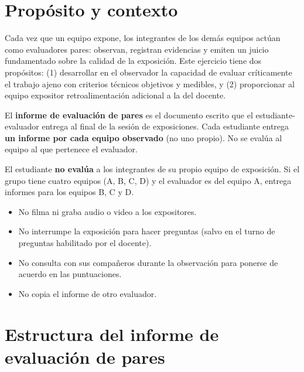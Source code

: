 \documentclass[11pt]{article}
\begin{document}
\section{\textcolor{utegreendk}{Propósito y contexto}}

Cada vez que un equipo expone, los integrantes de los demás equipos actúan como evaluadores pares: observan, registran evidencias y emiten un juicio fundamentado sobre la calidad de la exposición. Este ejercicio tiene dos propósitos: (1) desarrollar en el observador la capacidad de evaluar críticamente el trabajo ajeno con criterios técnicos objetivos y medibles, y (2) proporcionar al equipo expositor retroalimentación adicional a la del docente.

El \textbf{informe de evaluación de pares} es el documento escrito que el estudiante-evaluador entrega al final de la sesión de exposiciones. Cada estudiante entrega \textbf{un informe por cada equipo observado} (no uno propio). No se evalúa al equipo al que pertenece el evaluador.

\begin{cajaclave}[title=Regla de exclusión]
	El estudiante \textbf{no evalúa} a los integrantes de su propio equipo de exposición. Si el grupo tiene cuatro equipos (A, B, C, D) y el evaluador es del equipo A, entrega informes para los equipos B, C y D.
\end{cajaclave}

\begin{cajaclave}[title=Qué NO debe hacer el evaluador]
	\begin{itemize}[leftmargin=14pt,itemsep=2pt]
		\item No filma ni graba audio o video a los expositores.
		\item No interrumpe la exposición para hacer preguntas (salvo en el turno de preguntas habilitado por el docente).
		\item No consulta con sus compañeros durante la observación para ponerse de acuerdo en las puntuaciones.
		\item No copia el informe de otro evaluador.
	\end{itemize}
\end{cajaclave}

\section{\textcolor{utegreendk}{Estructura del informe de evaluación de pares}}
\end{document}

